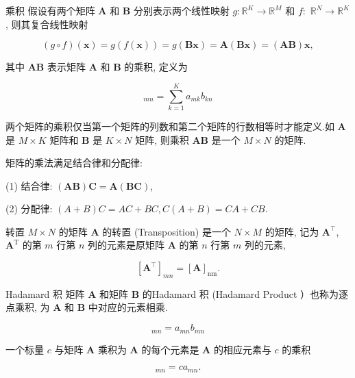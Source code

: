 \documentclass[10pt]{article}
\begin{document}
乘积 假设有两个矩阵 $\boldsymbol{A}$ 和 $\boldsymbol{B}$ 分别表示两个线性映射 $g: \mathbb{R}^{K} \rightarrow \mathbb{R}^{M}$ 和 $f:$ $\mathbb{R}^{N} \rightarrow \mathbb{R}^{K}$, 则其复合线性映射


\begin{equation*}
(g \circ f)(\boldsymbol{x})=g(f(\boldsymbol{x}))=g(\boldsymbol{B} \boldsymbol{x})=\boldsymbol{A}(\boldsymbol{B} \boldsymbol{x})=(\boldsymbol{A B}) \boldsymbol{x}, \tag{A.22}
\end{equation*}


其中 $\boldsymbol{A B}$ 表示矩阵 $\boldsymbol{A}$ 和 $\boldsymbol{B}$ 的乘积, 定义为


\begin{equation*}
[\boldsymbol{A B}]_{m n}=\sum_{k=1}^{K} a_{m k} b_{k n} \tag{A.23}
\end{equation*}


两个矩阵的乘积仅当第一个矩阵的列数和第二个矩阵的行数相等时才能定义.如 $\boldsymbol{A}$ 是 $M \times K$ 矩阵和 $\boldsymbol{B}$ 是 $K \times N$ 矩阵, 则乘积 $\boldsymbol{A B}$ 是一个 $M \times N$ 的矩阵.

矩阵的乘法满足结合律和分配律:

(1) 结合律: $(\boldsymbol{A B}) \boldsymbol{C}=\boldsymbol{A}(\boldsymbol{B C})$,

(2) 分配律: $(A+B) C=A C+B C, C(A+B)=C A+C B$.

转置 $M \times N$ 的矩阵 $\boldsymbol{A}$ 的转置 (Transposition) 是一个 $N \times M$ 的矩阵, 记为 $\boldsymbol{A}^{\top}$, $\boldsymbol{A}^{\mathrm{T}}$ 的第 $m$ 行第 $n$ 列的元素是原矩阵 $\boldsymbol{A}$ 的第 $n$ 行第 $m$ 列的元素,


\begin{equation*}
\left[\boldsymbol{A}^{\top}\right]_{m n}=[\boldsymbol{A}]_{\mathrm{nm}} . \tag{A.24}
\end{equation*}


Hadamard 积 矩阵 $\boldsymbol{A}$ 和矩阵 $\boldsymbol{B}$ 的Hadamard 积 (Hadamard Product ）也称为逐点乘积, 为 $\boldsymbol{A}$ 和 $\boldsymbol{B}$ 中对应的元素相乘.


\begin{equation*}
[\boldsymbol{A} \odot \boldsymbol{B}]_{m n}=a_{m n} b_{m n} \tag{A.25}
\end{equation*}


一个标量 $c$ 与矩阵 $\boldsymbol{A}$ 乘积为 $\boldsymbol{A}$ 的每个元素是 $\boldsymbol{A}$ 的相应元素与 $c$ 的乘积


\begin{equation*}
[c \boldsymbol{A}]_{m n}=c a_{m n} . \tag{A.26}
\end{equation*}
\end{document}
